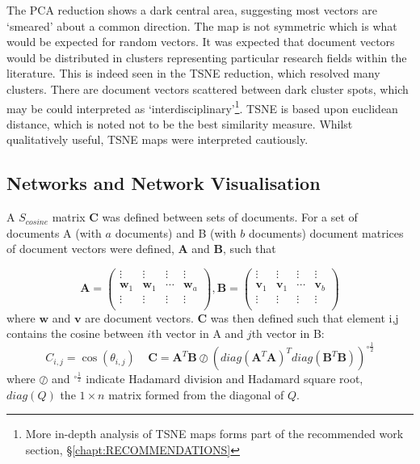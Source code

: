The PCA reduction shows a dark central area, suggesting most vectors are `smeared' about a common direction. The map is not symmetric which is what would be expected for random vectors. It was expected that document vectors would be distributed in clusters representing particular research fields within the literature. This is indeed seen in the TSNE reduction, which resolved many clusters. There are document vectors scattered between dark cluster spots, which may be could interpreted as `interdisciplinary'\footnote{More in-depth analysis of TSNE maps forms part of the recommended work section, \S\ref{chapt:RECOMMENDATIONS}}.
TSNE is based upon euclidean distance, which is noted not to be the best similarity measure. Whilst qualitatively useful, TSNE maps were interpreted cautiously.
\subsection{Networks and Network Visualisation}
\label{sec:COSINEMAT}
A $S_{cosine}$ matrix $\mathbf{C}$ was defined between sets of documents. For a set of documents  A (with $a$ documents) and B (with $b$ documents) document matrices of document vectors were defined, $\mathbf{A}$ and $\mathbf{B}$, such that 

$$\mathbf{A} = \left( \begin{array}{cccc}
\vdots & \vdots & \vdots & \vdots \\
\mathbf{w}_1 & \mathbf{w}_1 & \cdots & \mathbf{w}_a \\
\vdots & \vdots & \vdots & \vdots \\ \end{array} \right) , \mathbf{B} = \left( \begin{array}{cccc}
\vdots & \vdots & \vdots & \vdots \\
\mathbf{v}_1 & \mathbf{v}_1 & \cdots & \mathbf{v}_b \\
\vdots & \vdots & \vdots & \vdots \\ \end{array} \right)$$ where $\textbf{w}$ and $\textbf{v}$ are document vectors.
$\mathbf{C}$ was then defined such that element i,j contains the cosine between $i$th vector in A and $j$th vector in B:
$$C_{i , j}=\cos(\theta_{i ,j}) \ \ \ \ \ \mathbf{C}=\mathbf{A}^T \mathbf{B} \oslash \left( diag(\mathbf{A}^T \mathbf{A})^T diag(\mathbf{B}^T \mathbf{B}) \right)^{\circ\frac12}$$
where $\oslash$ and $^{\circ\frac12}$ indicate Hadamard division and Hadamard square root, $diag(Q)$ the $1 \times n$ matrix formed from the diagonal of $Q$. 

